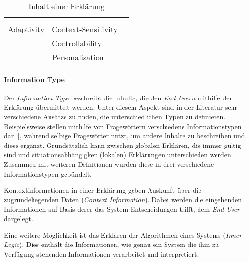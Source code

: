 \begin{table}[bht!]
\begin{center}
\begin{tabular}{|p{}|p{}|p{}|}
                                                \cite{hernandez-bocanegra_effects_2020} \\
            \hline
            Adaptivity          & Context-Sensitivity & \cite{kaptein_personalised_2017} \cite{cassens_ambient_2019} \\
                                & Controllability & \cite{abdulrahman_belief-based_2019} \cite{cheng2019explaining} \\
                                & Personalization & \cite{kaptein_personalised_2017} \cite{cassens_ambient_2019}
                                                    \cite{sokol_one_2020} \cite{tintarev_designing_nodate}
                                                    \cite{sokol_explainability_2020} \\
                                
            \hline
        \end{tabular}
    \end{center}
    \caption{Inhalt einer Erklärung}
    \label{tab:content_of_explanations}
\end{table}

\paragraph{Information Type} Der \textit{Information Type} beschreibt die Inhalte, die den \textit{End Usern} mithilfe der Erklärung übermittelt werden. Unter diesem Aspekt sind in der Literatur sehr verschiedene Ansätze zu finden, die unterschiedlichen Typen zu definieren. Beispielsweise stellen \cite{chazette_end-users_nodate} mithilfe von Fragewörtern verschiedene Informationstypen dar [\cite{chazette_end-users_nodate}], während \citeauthor{rosenfeld_explainability_2019} selbige Fragewörter nutzt, um andere Inhalte zu beschreiben und diese ergänzt. Grundsätzlich kann zwischen globalen Erklären, die immer gültig sind und situationsabhängigken (lokalen) Erklärungen unterschieden werden \cite{lim_2009_assessing}. Zusammen mit weiteren Defnitionen \cite{kaptein_personalised_2017, abdulrahman_belief-based_2019} wurden diese in drei verschiedene Informationstypen gebündelt.

Kontextinformationen in einer Erklärung geben Auskunft über die zugrundeliegenden Daten (\textit{Context Information}). Dabei werden die eingehenden Informationen auf Basis derer das System Entscheidungen trifft, dem \textit{End User} dargelegt.

Eine weitere Möglichkeit ist das Erklären der Algorithmen eines Systems (\textit{Inner Logic}). Dies enthält die Informationen, wie genau ein System die ihm zu Verfügung stehenden Informationen verarbeitet und interpretiert.

